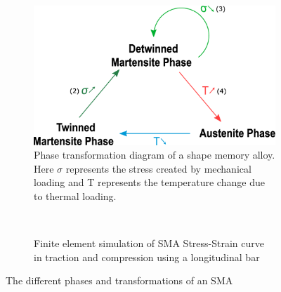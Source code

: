 \begin{figure}[H]
 \centering
 \begin{subfigure}[t]{0.45\textwidth}
    \includegraphics[width=\textwidth]{Figures/Phase_Transf_Diagram_Text.eps}
    \caption{Phase transformation diagram of a shape memory alloy. Here $\sigma$ represents the stress created by mechanical loading and T represents the temperature change due to thermal loading.}
    \label{fig:PhaseTransfDiagram}
 \end{subfigure}
	~
 \begin{subfigure}[t]{0.45\textwidth}
    {\footnotesize
      \def\svgwidth{\textwidth}
      
    }
    \vspace{-13pt}
    \caption{Finite element simulation of SMA Stress-Strain curve in traction and compression using a longitudinal bar}
    \label{fig:FigElongationStressStrain}
  \end{subfigure}
	\caption{The different phases and transformations of an SMA}
	\label{fig:SMAPhaseChange}
\end{figure}


